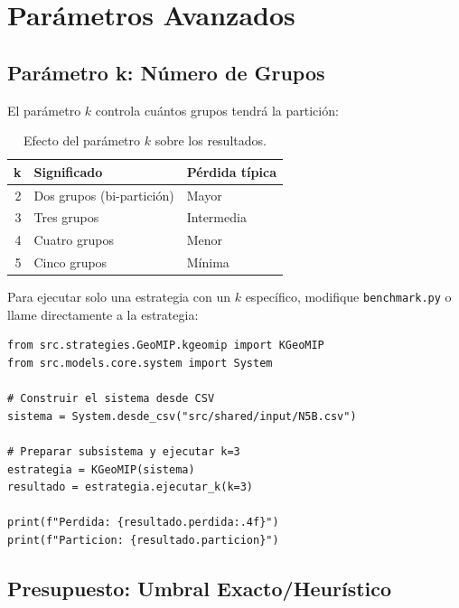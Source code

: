 \section{Parámetros Avanzados}
\label{sec:avanzado}

\subsection{Parámetro k: Número de Grupos}

El parámetro $k$ controla cuántos grupos tendrá la partición:

\begin{table}[H]
    \centering
    \caption{Efecto del parámetro $k$ sobre los resultados.}
    \begin{tabular}{rll}
        \toprule
        \textbf{k} & \textbf{Significado} & \textbf{Pérdida típica} \\
        \midrule
        2 & Dos grupos (bi-partición) & Mayor \\
        3 & Tres grupos              & Intermedia \\
        4 & Cuatro grupos            & Menor \\
        5 & Cinco grupos             & Mínima \\
        \bottomrule
    \end{tabular}
\end{table}

Para ejecutar solo una estrategia con un $k$ específico, modifique \lstinline|benchmark.py| o llame directamente a la estrategia:

\begin{lstlisting}[style=python, caption={Uso directo de KGeoMIP con k=3.}]
from src.strategies.GeoMIP.kgeomip import KGeoMIP
from src.models.core.system import System

# Construir el sistema desde CSV
sistema = System.desde_csv("src/shared/input/N5B.csv")

# Preparar subsistema y ejecutar k=3
estrategia = KGeoMIP(sistema)
resultado = estrategia.ejecutar_k(k=3)

print(f"Perdida: {resultado.perdida:.4f}")
print(f"Particion: {resultado.particion}")
\end{lstlisting}

\subsection{Presupuesto: Umbral Exacto/Heurístico}

